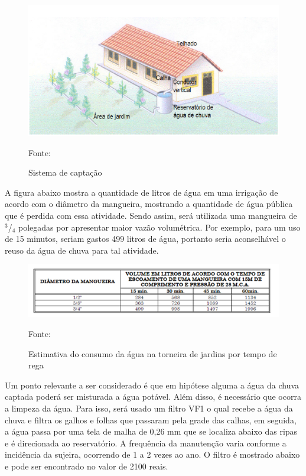  \begin{figure}[H]
	\centering
	\label{SistemaDeCaptacao}
		\includegraphics[keepaspectratio=true,scale=1.0]{figuras/SistemaDeCaptacao.png}
	\caption{Sistema de capta\c{c}\~ao}
	\small{Fonte:  \cite{WATERFALL}}
\end{figure}
 
 A figura abaixo mostra a quantidade de litros de \'agua em uma irriga\c{c}\~ao de acordo com o di\^ametro da mangueira, mostrando a quantidade de \'agua p\'ublica que \'e perdida com essa atividade. Sendo assim, ser\'a utilizada uma mangueira de $^{3}$/$_{4}$ polegadas por apresentar maior vaz\~ao volum\'etrica.  Por exemplo, para um uso de 15 minutos, seriam gastos 499 litros de \'agua, portanto seria aconselh\'avel o reuso da \'agua de chuva para tal atividade.
 
 \begin{figure}[H]
	\centering
	\label{ConsumoAguaRega}
		\includegraphics[keepaspectratio=true,scale=1.0]{figuras/ConsumoAguaRega.png}
	\caption{Estimativa do consumo da \'agua na torneira de jardins por tempo de rega}
	\small{Fonte:  \cite{VICKERS}}
\end{figure}
 
Um ponto relevante a ser considerado \'e que em hip\'otese alguma a \'agua da chuva captada poder\'a ser misturada a \'agua pot\'avel. Al\'em disso, \'e necess\'ario que ocorra a limpeza da \'agua. Para isso, ser\'a usado um filtro VF1 o qual recebe a \'agua da chuva e filtra os galhos e folhas que passaram pela grade das calhas, em seguida, a \'agua passa por uma tela de malha de 0,26 mm que se localiza abaixo das ripas e \'e direcionada ao reservat\'orio. A frequ\^encia da manuten\c{c}\~ao varia conforme a incid\^encia da sujeira, ocorrendo de 1 a 2 vezes ao ano. O filtro \'e mostrado abaixo e pode ser encontrado no valor de 2100 reais. \cite{VICKERS} 
 
